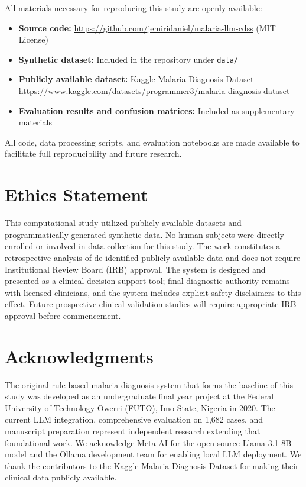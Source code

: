 \documentclass[12pt,a4paper]{article}
\begin{document}
All materials necessary for reproducing this study are openly available:

\begin{itemize}
  \item \textbf{Source code:} \url{https://github.com/jemiridaniel/malaria-llm-cdss} (MIT License)
  \item \textbf{Synthetic dataset:} Included in the repository under \texttt{data/}
  \item \textbf{Publicly available dataset:} Kaggle Malaria Diagnosis Dataset \cite{ref27} --- \url{https://www.kaggle.com/datasets/programmer3/malaria-diagnosis-dataset}
  \item \textbf{Evaluation results and confusion matrices:} Included as supplementary materials
\end{itemize}

All code, data processing scripts, and evaluation notebooks are made available to facilitate full reproducibility and future research.

\section*{Ethics Statement}

This computational study utilized publicly available datasets and programmatically generated synthetic data. No human subjects were directly enrolled or involved in data collection for this study. The work constitutes a retrospective analysis of de-identified publicly available data and does not require Institutional Review Board (IRB) approval. The system is designed and presented as a clinical decision support tool; final diagnostic authority remains with licensed clinicians, and the system includes explicit safety disclaimers to this effect. Future prospective clinical validation studies will require appropriate IRB approval before commencement.

\section*{Acknowledgments}

The original rule-based malaria diagnosis system that forms the baseline of this study was developed as an undergraduate final year project at the Federal University of Technology Owerri (FUTO), Imo State, Nigeria in 2020. The current LLM integration, comprehensive evaluation on 1,682 cases, and manuscript preparation represent independent research extending that foundational work. We acknowledge Meta AI for the open-source Llama 3.1 8B model \cite{ref9} and the Ollama development team \cite{ref13} for enabling local LLM deployment. We thank the contributors to the Kaggle Malaria Diagnosis Dataset \cite{ref27} for making their clinical data publicly available.
\end{document}
